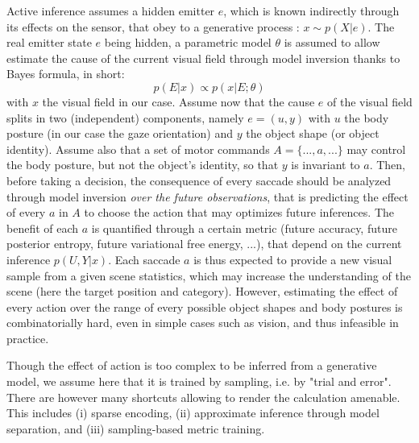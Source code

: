 Active inference assumes a hidden emitter $e$, which is known indirectly through its effects on the sensor, that obey to a generative process : $x\sim p(X|e)$. The real emitter state $e$ being hidden, a parametric model $\theta$ is assumed to allow estimate the cause of the current visual field through model inversion thanks to Bayes formula, in short:
$$p(E|x) \propto p(x|E;\theta)$$
with $x$ the visual field in our case. Assume now that the cause $e$ of the visual field splits in two (independent) components, namely $e = (u,y)$ with $u$ the body posture (in our case the gaze orientation) and $y$ the object shape (or object identity). Assume also that a set of motor commands $A = \{..., a, ...\}$ may control the body posture, but not the object's identity, so that $y$ is invariant to $a$.
Then, before taking a decision, the consequence of every saccade should be analyzed through model inversion \emph{over the future observations}, that is predicting the effect of every $a$ in $A$ to choose the action that may optimizes future inferences. The benefit of each $a$ is quantified through a certain metric (future accuracy, future posterior entropy, future variational free energy, ...), that depend on the current inference $p(U,Y|x)$. Each saccade $a$ is thus expected to provide a new visual sample from a given scene statistics, which may increase the understanding of the scene (here the target position and category). However, estimating the effect of every action over the range of every possible object shapes and body postures is combinatorially hard, even in simple cases such as vision, and thus infeasible in practice. 



Though the effect of action is too complex to be inferred from a generative model, we assume here that it is trained by sampling, i.e. by "trial and error". There are however many shortcuts allowing to render the calculation amenable. This includes (i) sparse encoding, (ii) approximate inference through model separation, and (iii) sampling-based metric training. 



